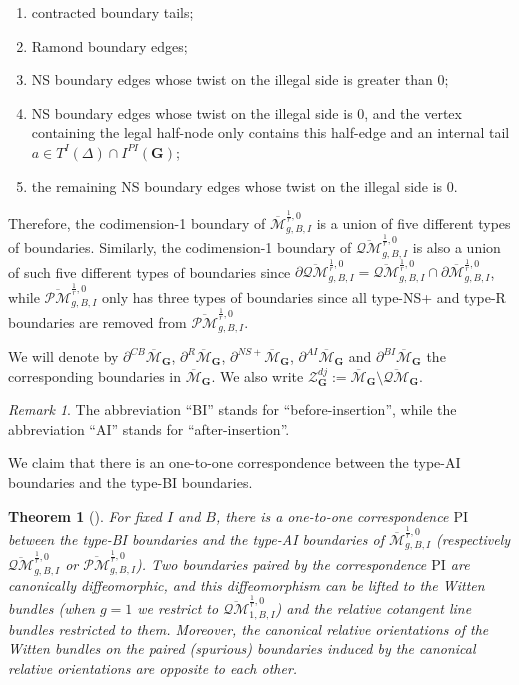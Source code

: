 \documentclass[11pt]{amsart}
\newtheorem{thm}[dummy]{Theorem}
\theoremstyle{definition}
\theoremstyle{remark}
\newtheorem{rmk}[dummy]{Remark}
\newcommand{\oPMb}{{\overline{\mathcal{PM}}}}
\newcommand{\oQMb}{{\overline{\mathcal{QM}}}}
\newcommand{\<}{\left<}
\renewcommand{\>}{\right>}
\numberwithin{equation}{section}
\def\Mbar{{\overline{\mathcal M}}}
\def\PI{{\text{PI}}}
\def\PI{\text{PI}}
\begin{document}
\begin{enumerate}
    \item[{CB}] contracted boundary tails;
    \item[{R}] Ramond boundary edges;
    \item[{NS+}] NS boundary edges whose twist on the illegal side is greater than $0$;
    \item[AI] NS boundary edges whose twist on the illegal side is $0$, and the vertex containing the legal half-node only contains this half-edge and an internal tail $a\in T^I(\Delta)\cap I^{PI}(\mathbf{G})$;
    \item[BI] the remaining NS boundary edges whose twist on the illegal side is $0$.
\end{enumerate}
Therefore, the codimension-1 boundary of $\Mbar^{\frac{1}{r},0}_{g,B,I}$ is a union of five different types of boundaries. Similarly, the codimension-1 boundary of $\oQMb^{\frac{1}{r},0}_{g,B,I}$ is also a union of such five different types of boundaries since $\partial \oQMb^{\frac{1}{r},0}_{g,B,I}=\oQMb^{\frac{1}{r},0}_{g,B,I}\cap  \partial \Mbar^{\frac{1}{r},0}_{g,B,I}$, while $\oPMb^{\frac{1}{r},0}_{g,B,I}$ only has three types of boundaries since all type-NS+ and type-R boundaries are removed from $\oPMb^{\frac{1}{r},0}_{g,B,I}$. 

We will denote by $\partial^{CB} \Mbar_{\bm{G}}$, $\partial^{R} \Mbar_{\bm{G}}$, $\partial^{NS+} \Mbar_{\bm{G}}$, $\partial^{AI} \Mbar_{\bm{G}}$ and  $\partial^{BI} \Mbar_{\bm{G}}$ the corresponding boundaries in $\Mbar_{\bm{G}}$. We also write $\mathcal Z^{dj}_{\bm{G}}:=\Mbar_{\bm{G}}\setminus \oQMb_{\bm{G}}$.
\begin{rmk}
    The abbreviation ``BI'' stands for ``before-insertion'', while the abbreviation ``AI'' stands for ``after-insertion''. 
\end{rmk}

We claim that there is an one-to-one correspondence between the type-AI boundaries and the type-BI boundaries.



    \begin{thm}[{\cite[Theorem 4.12]{TZ1}}]\label{thm  PI boundaries paried}
 For fixed $I$ and $B$, there is a one-to-one correspondence $\PI$ between the type-BI boundaries and the type-AI boundaries of $\Mbar^{\frac{1}{r},0}_{g,B,I}$ (respectively $\oQMb^{\frac{1}{r},0}_{g,B,I}$ or $\oPMb^{\frac{1}{r},0}_{g,B,I}$). Two boundaries paired by the correspondence $\PI$ are canonically diffeomorphic, and this diffeomorphism can be lifted to the Witten bundles (when $g=1$ we restrict to $\oQMb^{\frac{1}{r},0}_{1,B,I}$) and the relative cotangent line bundles restricted to them. Moreover, the canonical relative orientations of the Witten bundles on the paired (spurious) boundaries induced by the canonical relative orientations are opposite to each other. 
 \end{thm}
\end{document}

